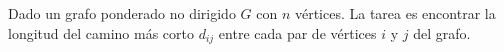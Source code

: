 Dado un grafo ponderado no dirigido $G$ con $n$ vértices. La tarea es encontrar la longitud del camino más corto $d_{ij}$ entre cada par de vértices $i$ y $j$ del grafo.